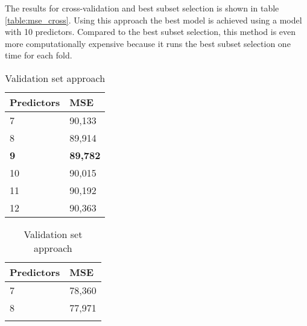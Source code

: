The results for cross-validation and best subset selection is shown in table \ref{table:mse_cross}. Using this approach the best model is achieved using a model with 10 predictors. Compared to the best subset selection, this method is even more computationally expensive because it runs the best subset selection one time for each fold.

\begin{table}	
	\centering
	\begin{subtable}[t]{2in}
		\centering
		\begin{tabular}{ p{2.5cm} p{1.5cm}  }
			\textbf{Predictors} & \textbf{MSE} \\
			\hline 
			\vspace{0.1px}
			7 & \vspace{0.1px} 90,133  \\\hline
			\vspace{0.03em}
			8 & \vspace{0.03em} 89,914  \\\hline
			\vspace{0.03em}
			\textbf{9} & \vspace{0.03em} \textbf{89,782}  \\\hline
			\vspace{0.03em}
			10 &\vspace{0.03em} 90,015  \\\hline
			\vspace{0.03em}
			11 & \vspace{0.03em} 90,192  \\\hline
			\vspace{0.03em}
			12 & \vspace{0.03em} 90,363  \\\hline
		\end{tabular}
		\caption{Validation set approach}\label{table:mse_validation}
	\end{subtable}
	\quad 
	\begin{subtable}[t]{2in}
		\centering
	\begin{tabular}{ p{2.5cm} p{1.5cm}  }
		\textbf{Predictors} & \textbf{MSE} \\
		\hline 
		\vspace{0.03em}
		7 & \vspace{0.03em} 78,360  \\\hline
		\vspace{0.03em}
		8 & \vspace{0.03em} 77,971  \\\hline
		\vspace{0.03em}

\end{tabular}
\end{subtable}
\end{table}

